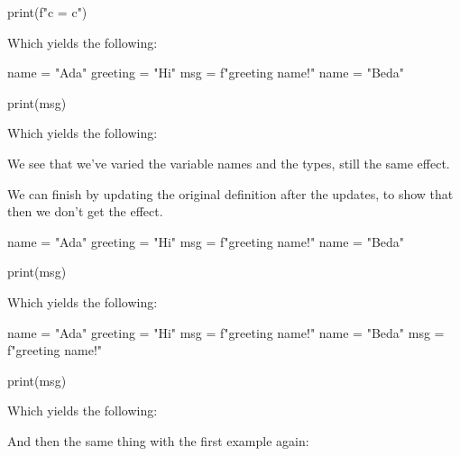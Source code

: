 \begin{description}
\begin{minipage}[t]{0.45\columnwidth}
\begin{pyblock}[varstateG1]
print(f"c = {c}")
        \end{pyblock}

        \vspace{0.5em}
        Which yields the following:
        \printpythontex[verbatim]
      \end{minipage}
      \hfill
      \begin{minipage}[t]{0.45\columnwidth}
        \begin{pyblock}[varstateG2]
name = "Ada"
greeting = "Hi"
msg = f"{greeting} {name}!"
name = "Beda"


print(msg)
        \end{pyblock}

        \vspace{0.5em}
        Which yields the following:
        \printpythontex[verbatim]
      \end{minipage}

      We see that we've varied the variable names and the types, still the same 
      effect.

      We can finish by updating the original definition after the updates, to 
      show that then we don't get the effect.

      \begin{minipage}[t]{0.45\columnwidth}
        \begin{pyblock}[varstateG2]
name = "Ada"
greeting = "Hi"
msg = f"{greeting} {name}!"
name = "Beda"


print(msg)
        \end{pyblock}

        \vspace{0.5em}
        Which yields the following:
        \printpythontex[verbatim]
      \end{minipage}
      \hfill
      \begin{minipage}[t]{0.45\columnwidth}
        \begin{pyblock}[varstateG2][highlightlines=5]
name = "Ada"
greeting = "Hi"
msg = f"{greeting} {name}!"
name = "Beda"
msg = f"{greeting} {name}!"

print(msg)
        \end{pyblock}

        \vspace{0.5em}
        Which yields the following:
        \printpythontex[verbatim]
      \end{minipage}

      And then the same thing with the first example again:


\end{description}
